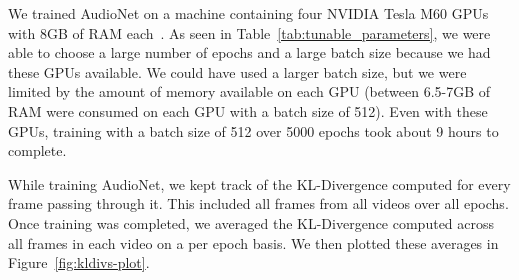 \documentclass[12pt,twoside]{article}
\theoremstyle{plain}
\theoremstyle{definition}
\theoremstyle{remark}
\begin{document}
We trained AudioNet on a machine containing four NVIDIA Tesla M60 GPUs with 8GB of RAM each~\cite{nvidia}.
As seen in Table~\ref{tab:tunable_parameters}, we were able to choose a large number of epochs and a large batch size because we had these GPUs available.
We could have used a larger batch size, but we were limited by the amount of memory available on each GPU (between 6.5-7GB of RAM were consumed on each GPU with a batch size of 512).
Even with these GPUs, training with a batch size of 512 over 5000 epochs took about 9 hours to complete.

While training AudioNet, we kept track of the KL-Divergence computed for every frame passing through it.
This included all frames from all videos over all epochs.
Once training was completed, we averaged the KL-Divergence computed across all frames in each video on a per epoch basis.
We then plotted these averages in Figure~\ref{fig:kldivs-plot}.
\end{document}
